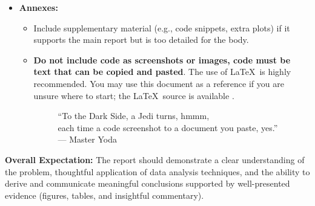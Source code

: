 \documentclass[11pt]{exam}
\begin{document}
\begin{itemize}
        \item \textbf{Annexes:} %
        \begin{itemize}
            \item Include supplementary material (e.g., code snippets, extra plots) if it supports the main report but is too detailed for the body.
            \item \textbf{Do not include code as screenshots or images, code must be text that can be copied and pasted}. The use of \LaTeX\ is highly recommended. You may use this document as a reference if you are unsure where to start; the \LaTeX~source is available \href{https://github.com/joanfrancesc/Data-Analysis-Project}{}.

            \begin{figure}[htbp]
              \centering
              \caption{``To the Dark Side, a Jedi turns, hmmm, \\each time a code screenshot to a document you paste, yes.'' --- Master Yoda}
              \label{fig:NoScreenshots}
            \end{figure}
        \end{itemize}
    \end{itemize}

    \textbf{Overall Expectation:} The report should demonstrate a clear understanding of the problem, thoughtful application of data analysis techniques, and the ability to derive and communicate meaningful conclusions supported by well-presented evidence (figures, tables, and insightful commentary).
\end{document}
